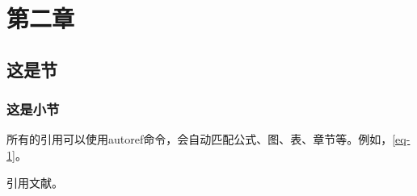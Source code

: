 \chapter{第二章}

\section{这是节}

\subsection{这是小节}


所有的引用可以使用autoref命令，会自动匹配公式、图、表、章节等。例如，\autoref{eq-1}。

引用文献\cite{trozzi2021umap,wang2012entropy}。


\let\cleardoublepage\clearpage



